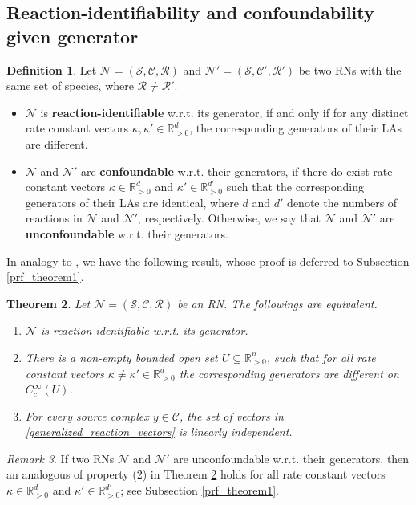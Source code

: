 \documentclass[10pt,a4paper]{amsart}
\newtheorem{theorem}{Theorem}[section]
\theoremstyle{definition}
\newtheorem{definition}[theorem]{Definition}
\theoremstyle{remark}
\newtheorem{remark}[theorem]{Remark}
\theoremstyle{consequence}
\def\k{\kappa}
\def\cN{\mathcal{N}}
\def\cR{\mathcal{R}}
\def\cS{\mathcal{S}}
\def\cC{\mathcal{C}}
\def\R{\mathbb{R}}
\numberwithin{equation}{section}
\begin{document}
\subsection{Reaction-identifiability and confoundability given generator}
\begin{definition}
Let $\cN = (\cS, \cC, \cR)$ and $\cN' = (\cS, \cC', \cR')$ be two RNs with the same set of species, where $\cR \neq \cR'$.
\begin{itemize}
    \item $\cN$ is \textbf{reaction-identifiable} w.r.t. its generator, if and only if for any distinct rate constant vectors $\k , \k' \in\R^d_{>0}$, the corresponding generators of their LAs are different.

    \item $\cN$ and $\cN'$ are \textbf{confoundable} w.r.t. their generators, if there do exist rate constant vectors $\k \in \R^d_{>0}$ and $\k'\in\R^{d'}_{>0}$ such that the corresponding generators of their LAs are identical, where $d$ and $d'$ denote the numbers of reactions in $\cN$ and $\cN'$, respectively. Otherwise, we say that $\cN$ and $\cN'$ are \textbf{unconfoundable} w.r.t. their generators.

 
\end{itemize}
\end{definition}



In analogy to  \cite{ident_CRNs}, we have the following result, whose proof is deferred to Subsection \ref{prf_theorem1}.
\begin{theorem}\label{theorem1}
Let $\cN = (\cS, \cC, \cR)$ be an RN. The followings are equivalent.
\begin{enumerate}
\item $\cN$ is reaction-identifiable w.r.t. its generator.

\item There is a non-empty bounded open set $U\subseteq\R^n_{>0}$, such that for all rate constant vector{s} $\kappa \neq \kappa'\in\R^d_{>0}$ the corresponding generators are different on $C^{\infty}_c(U)$.

\item For every source complex $y\in \cC$, the set of vectors in \eqref{generalized_reaction_vectors}
is linearly independent.

\end{enumerate}

\end{theorem}


\begin{remark}\label{rmk-theorem1}
   If two RNs $\cN$ and $\cN'$ are unconfoundable w.r.t. their generators, then an analogous of property
(2) in Theorem \ref{theorem1} holds for all rate constant vectors $\kappa \in \mathbb{R}^d_{>0}$ and $\kappa' \in \mathbb{R}^{d'}_{>0}$; see Subsection \ref{prf_theorem1}.
\end{remark}
\end{document}
